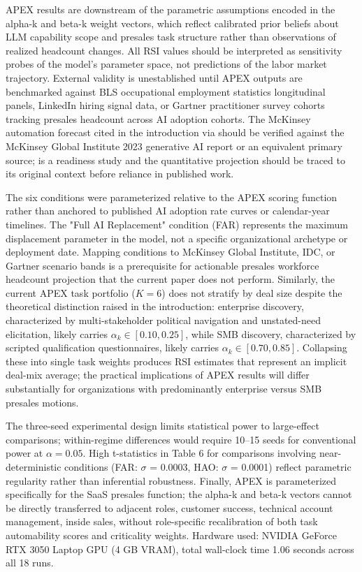 \documentclass[10pt, conference]{IEEEtran}
\begin{document}
\label{sec:limitations}

APEX results are downstream of the parametric assumptions encoded in the alpha-k and beta-k weight vectors, which reflect calibrated prior beliefs about LLM capability scope and presales task structure rather than observations of realized headcount changes. All RSI values should be interpreted as sensitivity probes of the model's parameter space, not predictions of the labor market trajectory. External validity is unestablished until APEX outputs are benchmarked against BLS occupational employment statistics longitudinal panels, LinkedIn hiring signal data, or Gartner practitioner survey cohorts tracking presales headcount across AI adoption cohorts. The McKinsey automation forecast cited in the introduction via \cite{johnk2020ready} should be verified against the McKinsey Global Institute 2023 generative AI report or an equivalent primary source; \cite{johnk2020ready} is a readiness study and the quantitative projection should be traced to its original context before reliance in published work.

The six conditions were parameterized relative to the APEX scoring function rather than anchored to published AI adoption rate curves or calendar-year timelines. The "Full AI Replacement" condition (FAR) represents the maximum displacement parameter in the model, not a specific organizational archetype or deployment date. Mapping conditions to McKinsey Global Institute, IDC, or Gartner scenario bands is a prerequisite for actionable presales workforce headcount projection that the current paper does not perform. Similarly, the current APEX task portfolio ($K = 6$) does not stratify by deal size despite the theoretical distinction raised in the introduction: enterprise discovery, characterized by multi-stakeholder political navigation and unstated-need elicitation, likely carries $\alpha_k \in [0.10, 0.25]$, while SMB discovery, characterized by scripted qualification questionnaires, likely carries $\alpha_k \in [0.70, 0.85]$. Collapsing these into single task weights produces RSI estimates that represent an implicit deal-mix average; the practical implications of APEX results will differ substantially for organizations with predominantly enterprise versus SMB presales motions.

The three-seed experimental design limits statistical power to large-effect comparisons; within-regime differences would require 10--15 seeds for conventional power at $\alpha = 0.05$. High t-statistics in Table 6 for comparisons involving near-deterministic conditions (FAR: $\sigma$ = 0.0003, HAO: $\sigma$ = 0.0001) reflect parametric regularity rather than inferential robustness. Finally, APEX is parameterized specifically for the SaaS presales function; the alpha-k and beta-k vectors cannot be directly transferred to adjacent roles, customer success, technical account management, inside sales, without role-specific recalibration of both task automability scores and criticality weights. Hardware used: NVIDIA GeForce RTX 3050 Laptop GPU (4 GB VRAM), total wall-clock time 1.06 seconds across all 18 runs.
\end{document}
